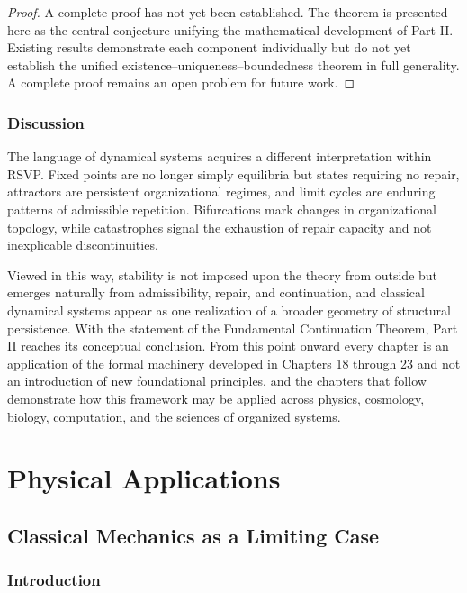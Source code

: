 \documentclass[11pt,oneside]{book}
\numberwithin{equation}{chapter}
\theoremstyle{definition}
\theoremstyle{plain}
\begin{document}
\begin{proof}
A complete proof has not yet been established. The theorem is presented
here as the central conjecture unifying the mathematical development of
Part II. Existing results demonstrate each component individually but do
not yet establish the unified existence--uniqueness--boundedness theorem in
full generality. A complete proof remains an open problem for future work.
\end{proof}

\section{Discussion}

The language of dynamical systems acquires a different interpretation within RSVP. Fixed points are no longer simply equilibria but states requiring no repair, attractors are persistent organizational regimes, and limit cycles are enduring patterns of admissible repetition. Bifurcations mark changes in organizational topology, while catastrophes signal the exhaustion of repair capacity and not inexplicable discontinuities.

Viewed in this way, stability is not imposed upon the theory from outside but emerges naturally from admissibility, repair, and continuation, and classical dynamical systems appear as one realization of a broader geometry of structural persistence. With the statement of the Fundamental Continuation Theorem, Part II reaches its conceptual conclusion. From this point onward every chapter is an application of the formal machinery developed in Chapters 18 through 23 and not an introduction of new foundational principles, and the chapters that follow demonstrate how this framework may be applied across physics, cosmology, biology, computation, and the sciences of organized systems.

\part{Physical Applications}


\chapter{Classical Mechanics as a Limiting Case}

\section{Introduction}
\end{document}
